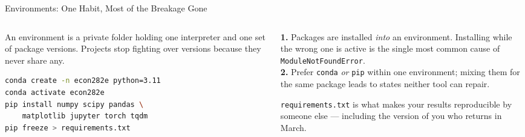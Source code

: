 \begin{frame}[fragile]{Environments: One Habit, Most of the Breakage Gone}
\begin{columns}[T]
\begin{column}{0.50\textwidth}
\small
An environment is a private folder holding one interpreter and one set of package versions. Projects stop fighting over versions because they never share any.
\medskip
\begin{lstlisting}[language=bash]
conda create -n econ282e python=3.11
conda activate econ282e
pip install numpy scipy pandas \
    matplotlib jupyter torch tqdm
pip freeze > requirements.txt
\end{lstlisting}
\end{column}
\begin{column}{0.47\textwidth}
\begin{cautionbox}[title=\textbf{Two rules}]\footnotesize
\textbf{1.} Packages are installed \emph{into} an environment. Installing while the wrong one is active is the single most common cause of \texttt{ModuleNotFoundError}.\\[1mm]
\textbf{2.} Prefer \texttt{conda} \emph{or} \texttt{pip} within one environment; mixing them for the same package leads to states neither tool can repair.
\end{cautionbox}
\medskip
\begin{takeawaybox}\footnotesize
\texttt{requirements.txt} is what makes your results reproducible by someone else --- including the version of you who returns in March.
\end{takeawaybox}
\end{column}
\end{columns}
\vspace{1mm}
\end{frame}

